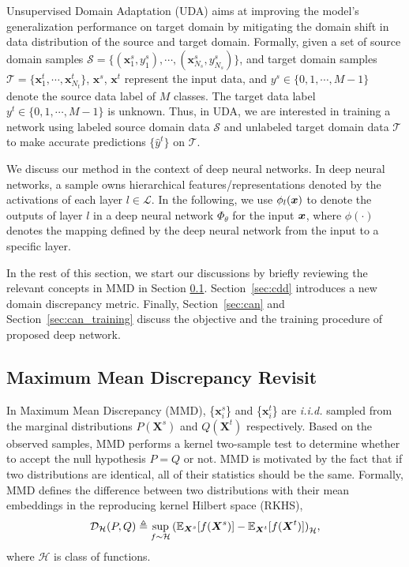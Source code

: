 \documentclass[10pt,twocolumn,letterpaper]{article}
\begin{document}
Unsupervised Domain Adaptation (UDA) aims at improving the model's generalization performance on target domain
by mitigating the domain shift in data distribution of the source and target domain.
Formally, given a set of source domain samples 
$\mathcal{S} = \{(\boldsymbol{x}^s_1, y^s_1), \cdots, (\boldsymbol{x}^s_{N_s}, y^s_{N_s})\}$,
and target domain samples
$\mathcal{T} = \{\boldsymbol{x}^t_1, \cdots, \boldsymbol{x}^t_{N_t}\}$, $\boldsymbol{x}^s$, $\boldsymbol{x}^t$ represent the input data, 
and $y^s \in \{0, 1, \cdots, M-1\}$ denote the source data label of $M$ classes. 
The target data label ${y^t} \in \{0, 1, \cdots, M-1\}$ is unknown.
Thus, in UDA,  
we are interested in training a network using labeled source domain data $\mathcal{S}$ and unlabeled target domain data $\mathcal{T}$ to make accurate predictions $\{\hat{y}^t\}$ on $\mathcal{T}$.

We discuss our method in the context of deep neural networks.
In deep neural networks, a sample owns hierarchical features/representations denoted by the activations of each layer $l \in \mathcal{L}$. 
In the following, 
we use $\phi_{l}(\boldsymbol{x})$ 
to denote the outputs of layer $l$ in a deep neural network  $\Phi_\theta$ for the input $\boldsymbol{x}$,
where $\phi(\cdot)$ denotes the mapping defined by the deep neural network 
from the input to a specific layer. 


In the rest of this section, we start our discussions by briefly reviewing the relevant concepts in MMD in Section \ref{revisit}. Section~\ref{sec:cdd} introduces a new domain discrepancy metric.  Finally, Section~\ref{sec:can} and Section~\ref{sec:can_training} discuss the objective and 
the training procedure of proposed deep network.




\subsection{Maximum Mean Discrepancy Revisit} \label{revisit}

In Maximum Mean Discrepancy (MMD), \{$\boldsymbol{x}^s_i$\} and \{$\boldsymbol{x}^t_i$\} are \textit{i.i.d.} sampled from  the marginal distributions $P(\boldsymbol{X}^s)$ and $Q(\boldsymbol{X}^t)$ respectively. Based on the observed samples, 
MMD \cite{sejdinovic2013equivalence} performs a kernel two-sample test to determine whether to accept the null hypothesis $P = Q$ or not.
MMD is motivated by the fact that if two distributions are identical, all of their statistics should be the same. Formally, MMD defines the difference between two distributions with their mean embeddings 
in the reproducing kernel Hilbert space (RKHS), \ie
\begin{align}
\mathcal{D}_{\mathcal{H}}(P, Q) \triangleq \sup_{f\sim \mathcal{H}}{(\mathbb{E}_{\boldsymbol{X}^s}[f(\boldsymbol{X}^s)] - \mathbb{E}_{\boldsymbol{X}^t}[f(\boldsymbol{X}^t)])}_\mathcal{H},
\end{align}
where $\mathcal{H}$ is class of functions.
\end{document}
